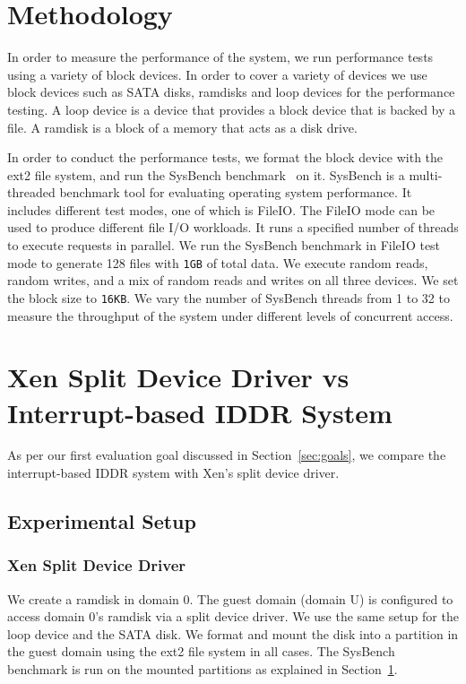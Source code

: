 \section{Methodology}
\label{sec:methodology}
In order to measure the performance of the system, we run performance
tests using a variety of block devices. In order to cover a variety of
devices we use block devices such as SATA disks, ramdisks and loop
devices for the performance testing. A loop device is a device that provides 
a block device that is backed by a file.  A ramdisk is a block of a memory
that acts as a disk drive.

In order to conduct the performance tests, we format the block
device with the ext2 file system, and run the SysBench
benchmark~\cite{sysbench} on it. SysBench is a multi-threaded benchmark
tool for evaluating operating system performance. It includes different test
modes, one of which is FileIO.  The FileIO mode can be used to produce
different file I/O workloads. It runs a specified number of threads to
execute requests in parallel. We run the SysBench benchmark in FileIO
test mode to generate 128 files with \texttt{1GB} of total data. We
execute random reads, random writes, and a mix of random reads and writes
on all three devices. We set the block size to \texttt{16KB}. We vary
the number of SysBench threads from 1 to 32 to measure the throughput of
the system under different levels of concurrent access.

\section{Xen Split Device Driver vs Interrupt-based IDDR System}
As per our first evaluation goal discussed in Section~\ref{sec:goals},
we compare the interrupt-based IDDR system with Xen's split device driver.

\subsection*{Experimental Setup}

\subsubsection*{Xen Split Device Driver}
We create a ramdisk in domain 0. The guest domain (domain U) is configured
to access domain 0's ramdisk via a split device driver. 
We use the same setup for the loop device and the SATA disk. 
We format and mount the disk into a partition in the
guest domain using the ext2 file system in all cases. The SysBench 
benchmark is run on the mounted partitions as explained in 
Section~\ref{sec:methodology}.

